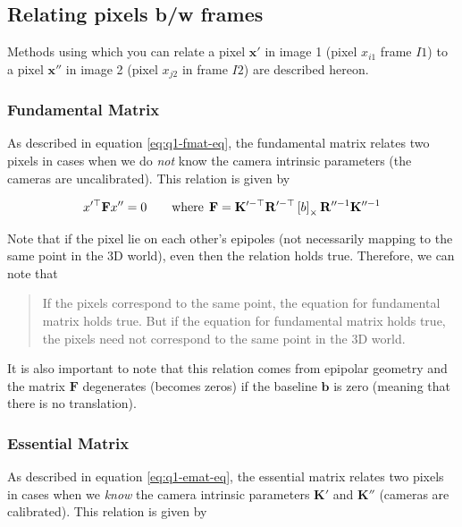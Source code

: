 \subsection{Relating pixels b/w frames}

Methods using which you can relate a pixel $\mathbf{x}'$ in image 1 (pixel $x_{i1}$ frame $I1$) to a pixel $\mathbf{x}''$ in image 2 (pixel $x_{j2}$ in frame $I2$) are described hereon.

\subsubsection*{Fundamental Matrix}

As described in equation \ref{eq:q1-fmat-eq}, the fundamental matrix relates two pixels in cases when we do \textit{not} know the camera intrinsic parameters (the cameras are uncalibrated). This relation is given by

\begin{equation}
    x'^\top \mathbf{F} x'' = 0
    \qquad \textup{where} \;\, \mathbf{F} = \mathbf{K}'^{-\top} \mathbf{R}'^{-\top} \left [ b \right ]_\times \mathbf{R}''^{-1} \mathbf{K}''^{-1}
\end{equation}

Note that if the pixel lie on each other's epipoles (not necessarily mapping to the same point in the 3D world), even then the relation holds true. Therefore, we can note that

\begin{quote}
    If the pixels correspond to the same point, the equation for fundamental matrix holds true. But if the equation for fundamental matrix holds true, the pixels need not correspond to the same point in the 3D world.
\end{quote}

It is also important to note that this relation comes from epipolar geometry and the matrix $\mathbf{F}$ degenerates (becomes zeros) if the baseline $\mathbf{b}$ is zero (meaning that there is no translation).

\subsubsection*{Essential Matrix}

As described in equation \ref{eq:q1-emat-eq}, the essential matrix relates two pixels in cases when we \textit{know} the  camera intrinsic parameters $\mathbf{K}'$ and $\mathbf{K}''$ (cameras are calibrated). This relation is given by

